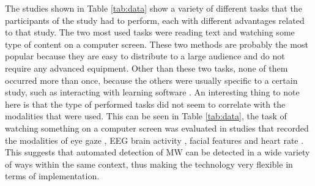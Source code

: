 The studies shown in Table \ref{tab:data} show a variety of different tasks that the participants of the study had to perform, each with different advantages related to that study. The two most used tasks were reading text and watching some type of content on a computer screen. These two methods are probably the most popular because they are easy to distribute to a large audience and do not require any advanced equipment. Other than these two tasks, none of them occurred more than once, because the others were usually specific to a certain study, such as interacting with learning software \cite{Hutt2017OutClassroom}. An interesting thing to note here is that the type of performed tasks did not seem to correlate with the modalities that were used. This can be seen in Table \ref{tab:data}, the task of watching something on a computer screen was evaluated in studies that recorded the modalities of eye gaze \cite{Zhao2017ScalableApproach}, EEG brain activity \cite{Russell2016MonitoringEnvironments}, facial features \cite{Stewart2017FaceComprehension} and heart rate \cite{Pham2015Attentivelearner:Tracking}. This suggests that automated detection of MW can be detected in a wide variety of ways within the same context, thus making the technology very flexible in terms of implementation.
